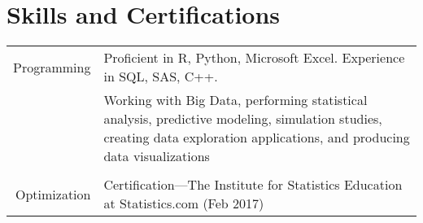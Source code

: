 \documentclass[a4paper,10pt]{article}
\begin{document}
\section{Skills and Certifications}
\begin{tabular}{rp{11cm}}
  Programming
  & Proficient in R, Python, Microsoft Excel. Experience in SQL, SAS, C++.\\
  & \footnotesize{Working with Big Data, performing statistical analysis, predictive modeling, simulation studies, creating data exploration applications, and producing data visualizations}\\ \\
  
  Optimization
  & Certification---The Institute for Statistics Education at Statistics.com (Feb 2017)\\
  
\end{tabular}


\end{document}

